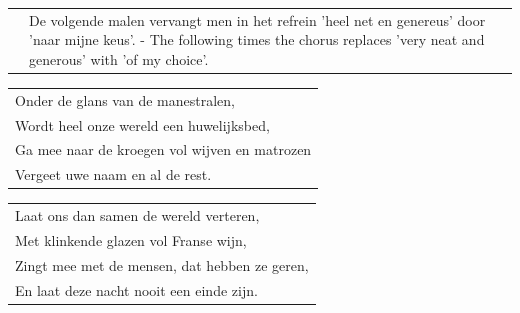 \documentclass{article}
\begin{document}
\begin{flushleft}
\begin{tabularx}{0.8\textwidth} {
   c >{\raggedright\arraybackslash}X}
\hspace{5mm} & {\small De volgende malen vervangt men in het refrein ’heel net en genereus’ door ’naar mijne keus’. - The following times the chorus replaces 'very neat and generous' with 'of my choice'.}
\end{tabularx}
\end{flushleft}
\begin{flushleft}
\begin{tabularx}{0.8\textwidth} {
   >{\raggedright\arraybackslash}X}
Onder de glans van de manestralen, \\
Wordt heel onze wereld een huwelijksbed, \\
Ga mee naar de kroegen vol wijven en matrozen \\
Vergeet uwe naam en al de rest. \\
\end{tabularx}
\end{flushleft}
\begin{flushleft}
\begin{tabularx}{0.8\textwidth} {
    >{\raggedright\arraybackslash}X}
Laat ons dan samen de wereld verteren, \\
Met klinkende glazen vol Franse wijn, \\
Zingt mee met de mensen, dat hebben ze geren, \\
En laat deze nacht nooit een einde zijn. \\
\end{tabularx}
\end{flushleft}
\end{document}
